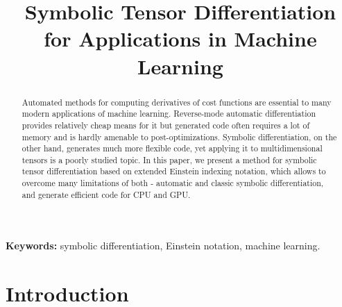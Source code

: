 \documentclass[conference]{IEEEtran}
\begin{document}
\title{Symbolic Tensor Differentiation \\ for Applications in Machine
  Learning}


\author{   \and {}  \and {} }

\maketitle


\begin{abstract}
  Automated methods for computing derivatives of cost functions are
  essential to many modern applications of machine
  learning. Reverse-mode automatic differentiation provides relatively
  cheap means for it but generated code often requires a lot of memory
  and is hardly amenable to post-optimizations. Symbolic
  differentiation, on the other hand, generates much more flexible
  code, yet applying it to multidimensional tensors is a poorly
  studied topic. In this paper, we present a method for symbolic
  tensor differentiation based on extended Einstein indexing notation,
  which allows to overcome many limitations of both - automatic and
  classic symbolic differentiation, and generate efficient code for
  CPU and GPU.


\end{abstract}

\textbf{Keywords:} symbolic differentiation, Einstein notation,
machine learning.

\IEEEpeerreviewmaketitle


\section{Introduction}
\end{document}
